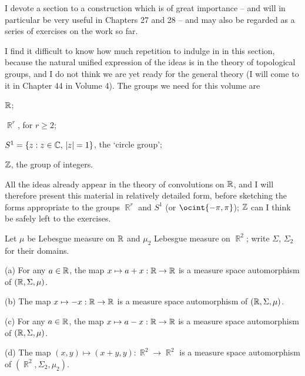 
\def\chaptername{Product measures}
\def\sectionname{Convolutions of functions}


I devote a section to a construction which is of great importance -- and
will in particular be very useful in Chapters 27 and 28 -- and may also
be regarded as a series of exercises on the work so far.

I find it difficult to know how much repetition to indulge in in this
section, because the natural unified expression of the ideas is in the
theory of topological
groups, and I do not think we are yet ready for the general theory (I
will come to it in Chapter 44 in Volume 4).   The groups we need for this volume are

\qquad $\Bbb R$;

\qquad $\BbbR^r$, for $r\ge 2$;

\qquad $S^1=\{z:z\in\Bbb C,\,|z|=1\}$, the `circle group';

\qquad $\Bbb Z$, the group of integers.

\noindent All the ideas already appear in the theory of convolutions on
$\Bbb R$, and I will therefore present this material in relatively
detailed form, before sketching the forms appropriate to the groups
$\BbbR^r$ and $S^1$ (or $\ocint{-\pi,\pi}$);  $\Bbb Z$ can I think be
safely left to the exercises.

 Let $\mu$ be Lebesgue measure on $\Bbb R$ and
$\mu_2$ Lebesgue measure on $\BbbR^2$;  write $\Sigma$, $\Sigma_2$ for
their domains.

(a) For any $a\in\Bbb R$, the map $x\mapsto a+x:\Bbb R\to\Bbb R$ is a
measure space automorphism of $(\Bbb R,\Sigma,\mu)$.

(b) The map $x\mapsto -x:\Bbb R\to\Bbb R$ is a measure space
automorphism of $(\Bbb R,\Sigma,\mu)$.

(c) For any $a\in\Bbb R$, the map $x\mapsto a-x:\Bbb R\to\Bbb R$ is a
measure space automorphism of $(\Bbb R,\Sigma,\mu)$.

(d) The map $(x,y)\mapsto(x+y,y):\BbbR^2\to\BbbR^2$ is a measure space
automorphism of $(\BbbR^2,\Sigma_2,\mu_2)$.

